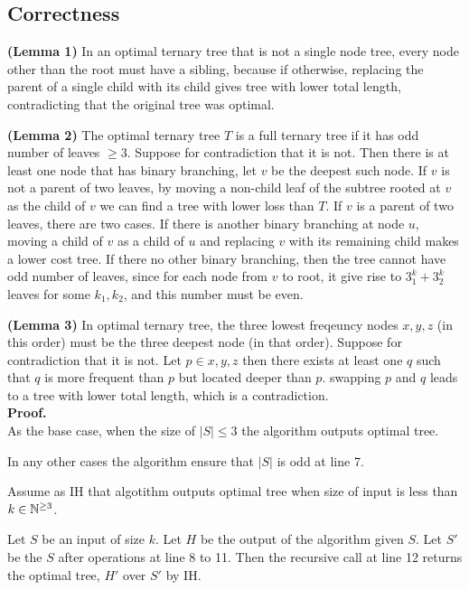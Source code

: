 \subsection*{Correctness}

\textbf{(Lemma 1)} In an optimal ternary tree that is not a single node tree, every node other than the root must have a sibling, because if otherwise, 
replacing the parent of a single child with its child gives tree with lower total length, contradicting that the original tree was optimal. 

\textbf{(Lemma 2)}
The optimal ternary tree $T$ is a full ternary tree if it has odd number of leaves $\geq 3$. Suppose for contradiction that it is not. 
Then there is at least one node that has binary branching, let $v$ be the deepest such node.
If $v$ is not a parent of two leaves, 
by moving a non-child leaf of the subtree rooted at $v$ 
as the child of $v$
we can find a tree with lower loss than $T$.
If $v$ is a parent of two leaves, there are two cases. 
If there is another binary branching at node $u$, 
moving a child of $v$ as a child of $u$ and replacing $v$ with its remaining child 
makes a lower cost tree.
If there no other binary branching, then the tree cannot have odd number of leaves, 
since for each node from $v$ to root, it give rise to $3^k_1 + 3^k_2$ leaves for some $k_1, k_2$, and this number must be even.


\textbf{(Lemma 3)} In optimal ternary tree, the  three lowest freqeuncy nodes $x, y, z$ (in this order) must be the three deepest node (in that order).
Suppose for contradiction that it is not. Let $p \in {x, y, z}$ then there exists at least one $q$ such that $q$ is more frequent than $p$ but located deeper than $p$.
swapping $p$ and $q$ leads to a tree with lower total length, which is a contradiction.\\


\textbf{Proof.}\\

As the base case, when the size of $|S| \leq 3$ the algorithm outputs optimal tree.

In any other cases the algorithm ensure that $|S|$ is odd at line 7.

Assume as IH that algotithm outputs optimal tree when size of input is less than $k \in \mathbb{N}^{\geq 3}$.

Let $S$ be an input of size $k$. 
Let $H$ be the output of the algorithm given $S$.
Let $S'$ be the $S$ after operations at line 8 to 11.
Then the recursive call at line 12 returns the optimal tree, $H'$ over $S'$ by IH.

